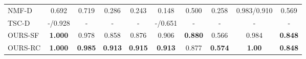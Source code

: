 \documentclass[10pt,twocolumn,letterpaper]{article}
\begin{document}
\begin{table*}[!ht]
\begin{tabular}{lccccccccc}
  NMF-D \cite{trigeorgis2014deep} &0.692 & 0.719   &0.286    &0.243  &0.148 &0.500 & 0.258 & 0.983/0.910  & 0.569\\
    
  TSC-D \cite{wang2015learning}   & -/0.928 &- & -   & -  & -/0.651  & -  & - & - &- \\  
 {OURS-SF} &\textbf{1.000} & {0.978} & {0.858}   & {0.876} & 0.906 & \textbf{0.880} & {0.566}        & {0.984}    &  \textbf{0.848}   \\
 {OURS-RC} &\textbf{1.000} & \textbf{0.985} & \textbf{0.913}   & \textbf{0.915} &\textbf{0.913}  & {0.877} & \textbf{0.574}        & \textbf{1.00}    &  \textbf{0.848}   \\
\bottomrule 
\end{tabular}
\label{TB_Quantitative_Results}
\end{table*}
\end{document}
